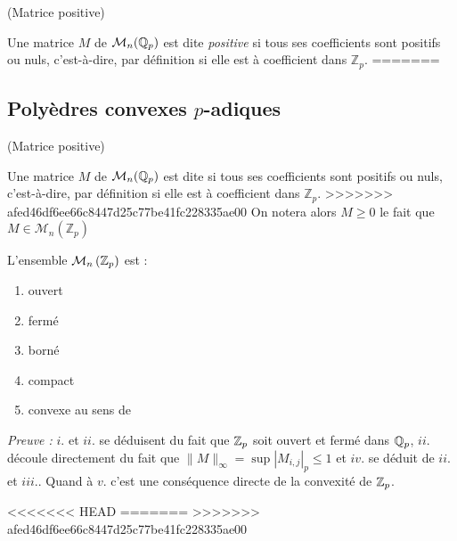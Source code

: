 \begin{definition}
	(Matrice positive)


	Une matrice $M$ de $\mathcal{M}_n(\mathbb{Q}_p)$ est dite \emph{positive} si tous ses coefficients sont positifs ou nuls, c'est-à-dire, par définition si elle est à coefficient dans $\mathbb{Z}_p$.
=======



\subsection{Polyèdres convexes \texorpdfstring{$p$}{p}-adiques} 

\begin{definition}
	(Matrice positive)


	Une matrice $M$ de $\mathcal{M}_n(\mathbb{Q}_p)$ est dite  si tous ses coefficients sont positifs ou nuls, c'est-à-dire, par définition si elle est à coefficient dans $\mathbb{Z}_p$.
>>>>>>> afed46df6ee66c8447d25c77be41fc228335ae00
	On notera alors $M\ge 0$ le fait que $M \in \mathcal{M}_{n}\left(\mathbb{Z}_p\right) $

\end{definition}

\begin{propriete}
	L'ensemble $\mathcal{M}_n \left(  \mathbb {Z}_p  \right)$ est :
	\begin{enumerate}[label=\roman*.]
	\item ouvert
	\item fermé
	\item borné
	\item compact
	\item convexe au sens de \parencite{monna_ensembles_1958}
\end{enumerate}
\end{propriete}
\textit{Preuve :}
$i.$ et $ii.$ se déduisent du fait que $ \mathbb {Z}_p $ soit ouvert et fermé dans $\mathbb{Q}_p$, $ii.$ découle directement du fait que $\|M\|_\infty = \sup |M_{i,j}|_p \le 1$ et $iv.$ se déduit de $ii.$ et $iii.$.
Quand à $v.$ c'est une conséquence directe de la convexité de $ \mathbb {Z}_p $.

<<<<<<< HEAD
=======
>>>>>>> afed46df6ee66c8447d25c77be41fc228335ae00
\begin{definition}
	

\end{definition}
\end{definition}
